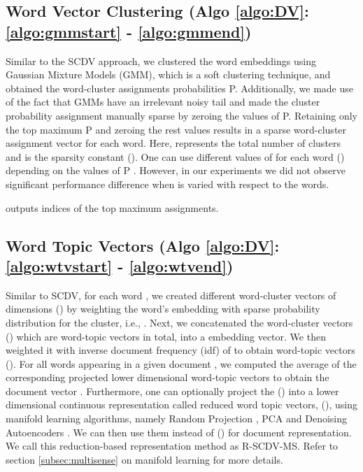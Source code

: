 \documentclass{ecai}
\begin{document}
\subsection{Word Vector Clustering (Algo \ref{algo:DV}: \ref{algo:gmmstart} - \ref{algo:gmmend})}
\label{algo:wvc}
Similar to the SCDV approach, we clustered the word embeddings using Gaussian Mixture Models (GMM), which is a soft clustering technique, and obtained the word-cluster assignments probabilities P.  Additionally, we made use of the fact that GMMs have an irrelevant noisy tail and made the cluster probability assignment  manually sparse by zeroing the values of P. Retaining only the top  maximum P and zeroing the rest  values results in a sparse word-cluster assignment vector  for each word. Here,  represents the total number of clusters and  is the sparsity constant (). One can use different values of  for each word () depending on the values of P . However, in our experiments we did not observe significant performance difference when  is varied with respect to the words. 

 outputs indices of the top  maximum assignments.
\subsection{Word Topic Vectors (Algo \ref{algo:DV}: \ref{algo:wtvstart} - \ref{algo:wtvend})}
\label{algo:wtv}
Similar to SCDV, for each word   , we created  different word-cluster vectors of  dimensions () by weighting the word's embedding with sparse probability distribution for the  cluster,  i.e., . Next, we concatenated the word-cluster vectors  () which are  word-topic vectors in total, into a  embedding vector. We then weighted it with inverse document frequency (idf) of  to obtain word-topic vectors (). For all words appearing in a given document , we computed the average of the corresponding projected lower dimensional word-topic vectors   to obtain the document vector . Furthermore, one can optionally project the () into a lower dimensional continuous representation called reduced word topic vectors, (), using manifold learning algorithms, namely Random Projection \cite{achlioptas2003database}, PCA \cite{abdi2010principal} and Denoising Autoencoders \cite{vincent2010stacked}. We can then use them instead of () for document representation. We call this reduction-based representation method as R-SCDV-MS. Refer to section \ref{subsec:multisense} on manifold learning for more details.
\end{document}
